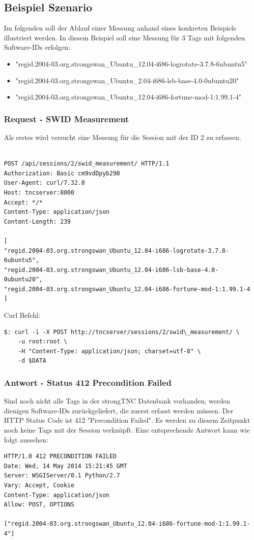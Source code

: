\documentclass[10pt,a4paper]{scrartcl}
\begin{document}
\subsection{Beispiel Szenario}
Im folgenden soll der Ablauf einer Messung anhand eines konkreten Beispiels illustriert werden. In diesem Beispiel soll eine Messung für 3 Tags mit folgenden Software-IDs erfolgen:
\begin{itemize}
\item "regid.2004-03.org.strongswan\_Ubuntu\_12.04-i686-logrotate-3.7.8-6ubuntu5"
\item "regid.2004-03.org.strongswan\_Ubuntu\_2.04-i686-lsb-base-4.0-0ubuntu20"
\item "regid.2004-03.org.strongswan\_Ubuntu\_12.04-i686-fortune-mod-1:1.99.1-4"
\end{itemize}

\subsubsection{Request - SWID Measurement}
Als erstes wird versucht eine Messung für die Session mit der ID 2 zu erfassen. \hfill
\begin{lstlisting}

POST /api/sessions/2/swid_measurement/ HTTP/1.1
Authorization: Basic cm9vdDpyb290
User-Agent: curl/7.32.0
Host: tncserver:8000
Accept: */*
Content-Type: application/json
Content-Length: 239

[
"regid.2004-03.org.strongswan_Ubuntu_12.04-i686-logrotate-3.7.8-6ubuntu5",
"regid.2004-03.org.strongswan_Ubuntu_12.04-i686-lsb-base-4.0-0ubuntu20",
"regid.2004-03.org.strongswan_Ubuntu_12.04-i686-fortune-mod-1:1.99.1-4
]

\end{lstlisting}

Curl Befehl:
\begin{lstlisting}
$: curl -i -X POST http://tncserver/sessions/2/swid\_measurement/ \
	-u root:root \
	-H "Content-Type: application/json; charset=utf-8" \
	-d $DATA
\end{lstlisting}
\subsubsection{Antwort - Status 412 Precondition Failed}
Sind noch nicht alle Tags in der strongTNC Datenbank vorhanden, werden dienigen Software-IDs zurückgeliefert, die zuerst erfasst werden müssen. Der HTTP Status Code ist 412 "Precondition Failed". Es werden zu diesem Zeitpunkt noch keine Tags mit der Session verknüpft. Eine entsprechende Antwort kann wie folgt aussehen:
\begin{lstlisting}
HTTP/1.0 412 PRECONDITION FAILED
Date: Wed, 14 May 2014 15:21:45 GMT
Server: WSGIServer/0.1 Python/2.7
Vary: Accept, Cookie
Content-Type: application/json
Allow: POST, OPTIONS

["regid.2004-03.org.strongswan_Ubuntu_12.04-i686-fortune-mod-1:1.99.1-4"]
\end{lstlisting}
\end{document}
